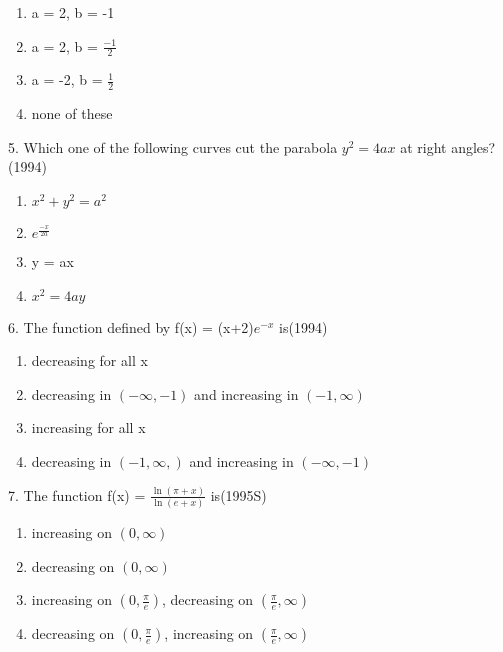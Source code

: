\documentclass[journal,12pt,twocolumn]{IEEEtran}
\theoremstyle{remark}
\begin{document}
\begin{enumerate}[label=\alph*.]
	\item a = 2, b = -1\\
	\item a = 2, b = $\displaystyle\frac{-1}{2}$\\
	\item a = -2, b = $\displaystyle\frac{1}{2}$\\
	\item none of these\\[3pt]
\end{enumerate}
5. Which one of the following curves cut the \indent  parabola
$y^2 = 4ax$ at right angles?\hspace{1.2cm}(1994)\\
\begin{enumerate}[label=\alph*.]
	\item $x^2 + y^2 = a^2$\\ 
        \item $e^{\frac{-x}{2a}}$\\
	\item y = ax\\
	\item $x^2 = 4ay$\\[3pt]
		\end{enumerate}
6.  The function defined by f(x) = (x+2)$e^{-x}$ 	
is\hspace{0.1cm}(1994)\\
\begin{enumerate}[label=\alph*.]
	\item decreasing for all x
	\item decreasing in $(-\infty, -1)$ and increasing
in $(-1, \infty)$
        \item increasing for all x
        \item decreasing in $(-1, \infty,)$ and increasing
in $(-\infty, -1)$\\[3pt]
\end{enumerate}
7.  The function f(x) = $\displaystyle\frac{\ln (\pi + x)}{\ln (e + x)}$ 
is\hspace{1.5cm}(1995S)\\[2pt]
\begin{enumerate}[label=\alph*.]
	\item increasing on $(0, \infty)$
	\item decreasing on $(0, \infty)$
	\item increasing on $(0, \displaystyle\frac{\pi}{e})$,
decreasing on $(\displaystyle\frac{\pi}{e}, \infty)$
        \item decreasing on $(0, \displaystyle\frac{\pi}{e})$,
increasing on $(\displaystyle\frac{\pi}{e}, \infty)$\\[3pt]
\end{enumerate}
\end{document}
